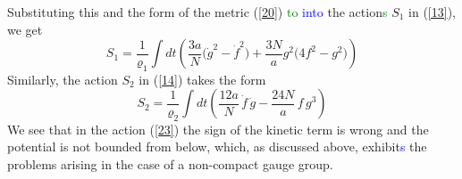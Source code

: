 \documentclass[prd,reprint,eqsecnum,nofootinbib]{revtex4-1}
\begin{document}
Substituting this and the form of the metric (\ref{20}) \textcolor{green}{to} \textcolor{blue}{into} the
action\textcolor{green}{s} $S_1$ in (\ref{13}), we get
\begin{equation}
    S_1 =\frac1{\varrho_1}\int dt \left( \frac{3a}{N}\Big(\dot{g}^2 -\dot{f}^2\Big)
+ \frac{3N}{a} g^2\Big(4f^2-g^2\Big) \right)\label{23}
\end{equation}
Similarly, the action $S_2$ in (\ref{14}) takes the form
\begin{equation}
    S_2 =\frac1{\varrho_2}\int dt \left( \frac{12a}{N}\, \dot f\,\dot g - \frac{24N}{a}\, f\, g^3\right)\label{24}
\end{equation}
We see that in the action (\ref{23}) the sign of the kinetic term
is wrong and the potential is not bounded from below, which, as
discussed above, exhibit\textcolor{blue}{s} the problems arising in the case of a
non-compact gauge group.
\end{document}
